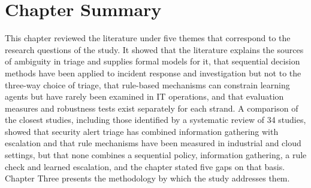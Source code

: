\section{Chapter Summary}

This chapter reviewed the literature under five themes that correspond to the research questions of the study. It showed that the literature explains the sources of ambiguity in triage and supplies formal models for it, that sequential decision methods have been applied to incident response and investigation but not to the three-way choice of triage, that rule-based mechanisms can constrain learning agents but have rarely been examined in IT operations, and that evaluation measures and robustness tests exist separately for each strand. A comparison of the closest studies, including those identified by a systematic review of 34 studies, showed that security alert triage has combined information gathering with escalation and that rule mechanisms have been measured in industrial and cloud settings, but that none combines a sequential policy, information gathering, a rule check and learned escalation, and the chapter stated five gaps on that basis. Chapter Three presents the methodology by which the study addresses them.
